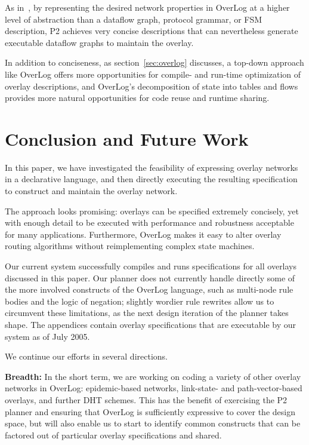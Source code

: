 \documentclass{sig-alt-full}
\def\Sys{P2\xspace}
\def\Lang{OverLog\xspace}
\begin{document}
As in~\cite{loo-hotnets04}, by representing the desired
network properties in \Lang at a higher level of abstraction than a
dataflow graph, protocol grammar, or FSM description, \Sys achieves
very concise 
descriptions that can nevertheless generate executable dataflow graphs 
to maintain the overlay. 

In addition to conciseness, as section~\ref{sec:overlog} discusses, a
top-down approach like \Lang offers more opportunities for compile- and
run-time optimization of overlay descriptions, and \Lang's
decomposition of state into tables and flows provides more natural
opportunities for code reuse and runtime sharing.  


\section{Conclusion and Future Work}
\label{sec:conclusion}

In this paper, we have investigated the feasibility of expressing
overlay networks in a declarative language, and then directly
executing the resulting specification to construct and maintain the
overlay network.  

The approach looks promising: overlays can be specified extremely
concisely, yet with enough detail to be executed with performance and
robustness acceptable for many applications.   Furthermore, \Lang
makes it easy to alter overlay routing algorithms without
reimplementing complex state machines.

Our current system successfully compiles and runs
specifications for all overlays discussed in this
paper.  Our planner does not currently handle
directly some of the more involved constructs of
the \Lang language, such as multi-node rule bodies
and the logic of negation; slightly wordier rule rewrites allow us
to circumvent these limitations, as the next
design iteration of the planner takes shape.  The
appendices contain overlay specifications
that are executable by our system as of July 2005.

We continue our efforts in several directions.

{\bf Breadth:} In the short term, we
are working on coding a variety 
of other overlay networks in \Lang: epidemic-based networks,
link-state- and path-vector-based overlays, and further DHT schemes.
This has the benefit of exercising the 
\Sys planner and ensuring that \Lang is sufficiently expressive to
cover the design space, but will also enable us to start to identify
common constructs that can be factored out of particular overlay
specifications and shared. 
\end{document}
